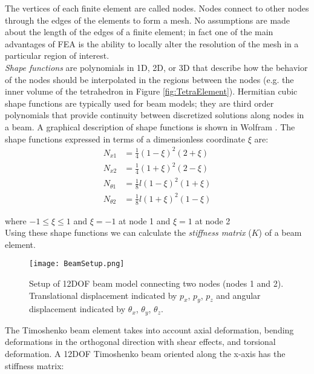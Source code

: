 {The vertices of each finite element are called nodes.  Nodes connect to other nodes through the edges of the elements to form a mesh.  No assumptions are made about the length of the edges of a finite element; in fact one of the main advantages of FEA is the ability to locally alter the resolution of the mesh in a particular region of interest.\\

\textit{Shape functions} are polynomials in 1D, 2D, or 3D that describe how the behavior of the nodes should be interpolated in the regions between the nodes (e.g. the inner volume of the tetrahedron in Figure \ref{fig:TetraElement}).  Hermitian cubic shape functions are typically used for beam models; they are third order polynomials that provide continuity between discretized solutions along nodes in a beam.  A graphical description of shape functions is shown in Wolfram \cite{Wolfram2016}.  The shape functions expressed in terms of a dimensionless coordinate $\xi$ are:
\begin{align*} 
N_{x1} &= \textstyle\frac{1}{4}(1-\xi)^2(2+\xi)\\
N_{x2} &= \textstyle\frac{1}{4}(1+\xi)^2(2-\xi)\\
N_{\theta1} &= \textstyle\frac{1}{8}l(1-\xi)^2(1+\xi)\\
N_{\theta2} &= \textstyle\frac{1}{8}l(1+\xi)^2(1-\xi)
\end{align*}

where $-1 \leq \xi \leq 1$ and $\xi = -1$ at node 1 and $\xi = 1$ at node 2\\

Using these shape functions we can calculate the \textit{stiffness matrix} ($K$) of a beam element.  


\begin{figure}
  \texttt{[image: BeamSetup.png]}
  \caption{Setup of 12DOF beam model connecting two nodes (nodes 1 and 2).  Translational displacement indicated by $p_x$, $p_y$, $p_z$ and angular displacement indicated by $\theta_x$, $\theta_y$, $\theta_z$.}
  \label{fig:BeamSetup}
\end{figure}

The Timoshenko beam element takes into account axial deformation, bending deformations in the orthogonal direction with shear effects, and torsional deformation.  A 12DOF Timoshenko beam oriented along the x-axis has the stiffness matrix:\\

}
